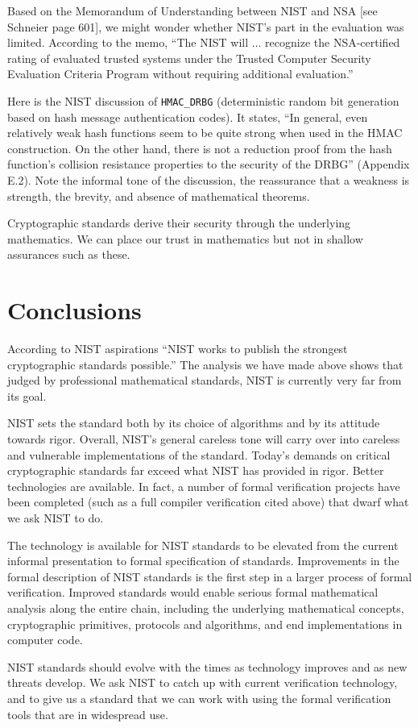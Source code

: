 \documentclass[11pt]{amsart} %
\begin{document}
Based on the Memorandum of Understanding between NIST and NSA [see Schneier page 601], we might
wonder whether NIST's part in the evaluation was limited.
According to the memo, ``The NIST will $\ldots$ recognize the NSA-certified rating of evaluated trusted
systems under the Trusted Computer Security Evaluation Criteria Program without requiring additional
evaluation.'' 

Here is the NIST discussion of {\tt HMAC\_DRBG}
(deterministic random bit generation based on hash message authentication codes).  It states, ``In general, even
relatively weak hash functions seem to be quite strong when used in the HMAC construction.
On the other hand, there is not a reduction proof from the hash function's collision resistance
properties to the security of the DRBG'' (Appendix E.2).  
Note the informal tone of the discussion, the  reassurance
that a weakness is strength, the brevity, and absence of mathematical theorems.  

Cryptographic standards derive their security through the
underlying mathematics.   We can place our trust in mathematics but not in shallow assurances such as these.

\section{Conclusions}


According to NIST aspirations
``NIST works to publish the strongest cryptographic standards possible.''
The analysis we have made above shows that judged by professional mathematical standards, NIST is currently
very far from its goal.


NIST sets the standard both
by its choice of algorithms and by its attitude towards rigor.
Overall,  NIST's general careless tone will 
carry over into careless and vulnerable implementations of the standard.  
Today's demands on critical cryptographic standards far exceed what NIST has provided in rigor.
Better technologies are available.  In fact,
a number of formal verification projects have been completed (such as a full 
compiler verification cited above) that dwarf what we ask NIST  to do. 

The technology is available for NIST standards to be elevated from the current informal presentation
to formal specification of standards.  Improvements in the formal description of NIST standards is the first
step in a larger process of formal verification.
Improved standards would enable serious formal mathematical analysis along the entire chain, including
the
underlying mathematical concepts, cryptographic primitives, protocols and algorithms, 
and end implementations
in computer code.

NIST standards should evolve with the times as technology improves and as new threats develop.
 We ask NIST to
catch up with current verification technology, and to give us a standard that we can
work with using the formal verification tools that are in widespread use.



\end{document}
